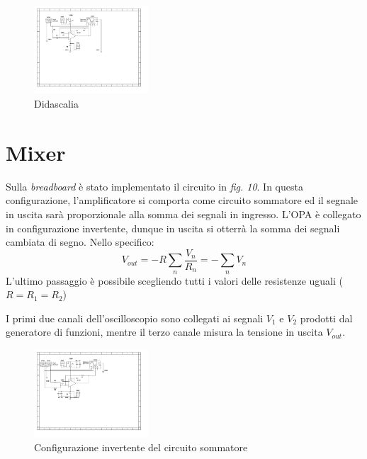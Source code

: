 \documentclass[journal]{IEEEtran}
\begin{document}
\begin{figure}[H]%
\begin {center}
\includegraphics[width=0.38\textwidth]{sch-simulations/output/OPA-deriv.pdf}
\caption{Didascalia}
\label{fig:oscilloscope}
\end {center}
\end{figure}


\section{Mixer} %
Sulla \textit{breadboard} è stato implementato il circuito in \textit{fig. 10}. In questa configurazione, l'amplificatore si comporta come circuito sommatore ed il segnale in uscita sarà proporzionale alla somma dei segnali in ingresso. L'OPA è collegato in configurazione invertente, dunque in uscita si otterrà la somma dei segnali cambiata di segno. Nello specifico: 
\[V_{out} = - R  \sum_{n} \frac{V_n}{R_n} = - \sum_{n} V_n\] L'ultimo passaggio è possibile scegliendo tutti i valori delle resistenze uguali ($R = R_1 = R_2$)  

I primi due canali dell'oscilloscopio sono collegati ai segnali $V_1$ e $V_2$ prodotti dal generatore di funzioni, mentre il terzo canale misura la tensione in uscita $V_{out}$.

\begin{figure}[H]%
\begin {center}
\includegraphics[width=0.38\textwidth]{sch-simulations/output/OPA-mixer.pdf}
\caption{Configurazione invertente del circuito sommatore}
\label{fig:oscilloscope}
\end {center}
\end{figure}
\end{document}

